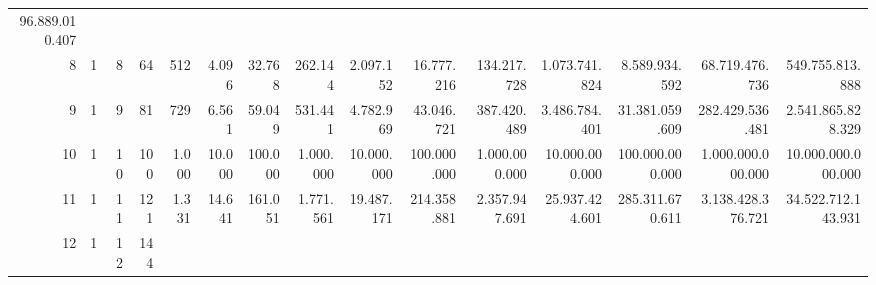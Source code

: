 \begin{table}[]
\begin{tabular}{rrrrrrrrrrrrrrr}
		{\color[HTML]{000000} 96.889.010.407} \\
		\rowcolor[HTML]{D9E1F2} 
		{\color[HTML]{000000} 8} &
		{\color[HTML]{000000} 1} &
		{\color[HTML]{000000} 8} &
		{\color[HTML]{000000} 64} &
		{\color[HTML]{000000} 512} &
		{\color[HTML]{000000} 4.096} &
		{\color[HTML]{000000} 32.768} &
		{\color[HTML]{000000} 262.144} &
		{\color[HTML]{000000} 2.097.152} &
		{\color[HTML]{000000} 16.777.216} &
		{\color[HTML]{000000} 134.217.728} &
		{\color[HTML]{000000} 1.073.741.824} &
		{\color[HTML]{000000} 8.589.934.592} &
		{\color[HTML]{000000} 68.719.476.736} &
		{\color[HTML]{000000} 549.755.813.888} \\
		{\color[HTML]{000000} 9} &
		{\color[HTML]{000000} 1} &
		{\color[HTML]{000000} 9} &
		{\color[HTML]{000000} 81} &
		{\color[HTML]{000000} 729} &
		{\color[HTML]{000000} 6.561} &
		{\color[HTML]{000000} 59.049} &
		{\color[HTML]{000000} 531.441} &
		{\color[HTML]{000000} 4.782.969} &
		{\color[HTML]{000000} 43.046.721} &
		{\color[HTML]{000000} 387.420.489} &
		{\color[HTML]{000000} 3.486.784.401} &
		{\color[HTML]{000000} 31.381.059.609} &
		{\color[HTML]{000000} 282.429.536.481} &
		{\color[HTML]{000000} 2.541.865.828.329} \\
		\rowcolor[HTML]{D9E1F2} 
		{\color[HTML]{000000} 10} &
		{\color[HTML]{000000} 1} &
		{\color[HTML]{000000} 10} &
		{\color[HTML]{000000} 100} &
		{\color[HTML]{000000} 1.000} &
		{\color[HTML]{000000} 10.000} &
		{\color[HTML]{000000} 100.000} &
		{\color[HTML]{000000} 1.000.000} &
		{\color[HTML]{000000} 10.000.000} &
		{\color[HTML]{000000} 100.000.000} &
		{\color[HTML]{000000} 1.000.000.000} &
		{\color[HTML]{000000} 10.000.000.000} &
		{\color[HTML]{000000} 100.000.000.000} &
		{\color[HTML]{000000} 1.000.000.000.000} &
		{\color[HTML]{000000} 10.000.000.000.000} \\
		{\color[HTML]{000000} 11} &
		{\color[HTML]{000000} 1} &
		{\color[HTML]{000000} 11} &
		{\color[HTML]{000000} 121} &
		{\color[HTML]{000000} 1.331} &
		{\color[HTML]{000000} 14.641} &
		{\color[HTML]{000000} 161.051} &
		{\color[HTML]{000000} 1.771.561} &
		{\color[HTML]{000000} 19.487.171} &
		{\color[HTML]{000000} 214.358.881} &
		{\color[HTML]{000000} 2.357.947.691} &
		{\color[HTML]{000000} 25.937.424.601} &
		{\color[HTML]{000000} 285.311.670.611} &
		{\color[HTML]{000000} 3.138.428.376.721} &
		{\color[HTML]{000000} 34.522.712.143.931} \\
		\rowcolor[HTML]{D9E1F2} 
		{\color[HTML]{000000} 12} &
		{\color[HTML]{000000} 1} &
		{\color[HTML]{000000} 12} &
		{\color[HTML]{000000} 144} &

\end{tabular}
\end{table}

